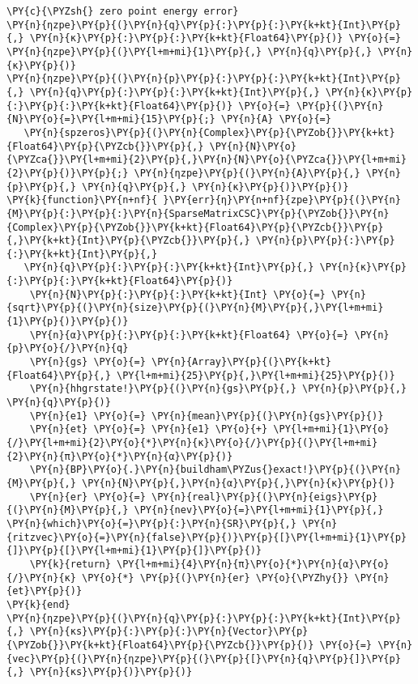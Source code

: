 \begin{Verbatim}[commandchars=\\\{\}]
\PY{c}{\PYZsh{} zero point energy error}
\PY{n}{ηzpe}\PY{p}{(}\PY{n}{q}\PY{p}{:}\PY{p}{:}\PY{k+kt}{Int}\PY{p}{,} \PY{n}{κ}\PY{p}{:}\PY{p}{:}\PY{k+kt}{Float64}\PY{p}{)} \PY{o}{=} \PY{n}{ηzpe}\PY{p}{(}\PY{l+m+mi}{1}\PY{p}{,} \PY{n}{q}\PY{p}{,} \PY{n}{κ}\PY{p}{)}
\PY{n}{ηzpe}\PY{p}{(}\PY{n}{p}\PY{p}{:}\PY{p}{:}\PY{k+kt}{Int}\PY{p}{,} \PY{n}{q}\PY{p}{:}\PY{p}{:}\PY{k+kt}{Int}\PY{p}{,} \PY{n}{κ}\PY{p}{:}\PY{p}{:}\PY{k+kt}{Float64}\PY{p}{)} \PY{o}{=} \PY{p}{(}\PY{n}{N}\PY{o}{=}\PY{l+m+mi}{15}\PY{p}{;} \PY{n}{A} \PY{o}{=}
   \PY{n}{spzeros}\PY{p}{(}\PY{n}{Complex}\PY{p}{\PYZob{}}\PY{k+kt}{Float64}\PY{p}{\PYZcb{}}\PY{p}{,} \PY{n}{N}\PY{o}{\PYZca{}}\PY{l+m+mi}{2}\PY{p}{,}\PY{n}{N}\PY{o}{\PYZca{}}\PY{l+m+mi}{2}\PY{p}{)}\PY{p}{;} \PY{n}{ηzpe}\PY{p}{(}\PY{n}{A}\PY{p}{,} \PY{n}{p}\PY{p}{,} \PY{n}{q}\PY{p}{,} \PY{n}{κ}\PY{p}{)}\PY{p}{)}
\PY{k}{function}\PY{n+nf}{ }\PY{err}{η}\PY{n+nf}{zpe}\PY{p}{(}\PY{n}{M}\PY{p}{:}\PY{p}{:}\PY{n}{SparseMatrixCSC}\PY{p}{\PYZob{}}\PY{n}{Complex}\PY{p}{\PYZob{}}\PY{k+kt}{Float64}\PY{p}{\PYZcb{}}\PY{p}{,}\PY{k+kt}{Int}\PY{p}{\PYZcb{}}\PY{p}{,} \PY{n}{p}\PY{p}{:}\PY{p}{:}\PY{k+kt}{Int}\PY{p}{,}
   \PY{n}{q}\PY{p}{:}\PY{p}{:}\PY{k+kt}{Int}\PY{p}{,} \PY{n}{κ}\PY{p}{:}\PY{p}{:}\PY{k+kt}{Float64}\PY{p}{)}
    \PY{n}{N}\PY{p}{:}\PY{p}{:}\PY{k+kt}{Int} \PY{o}{=} \PY{n}{sqrt}\PY{p}{(}\PY{n}{size}\PY{p}{(}\PY{n}{M}\PY{p}{,}\PY{l+m+mi}{1}\PY{p}{)}\PY{p}{)}
    \PY{n}{α}\PY{p}{:}\PY{p}{:}\PY{k+kt}{Float64} \PY{o}{=} \PY{n}{p}\PY{o}{/}\PY{n}{q}
    \PY{n}{gs} \PY{o}{=} \PY{n}{Array}\PY{p}{(}\PY{k+kt}{Float64}\PY{p}{,} \PY{l+m+mi}{25}\PY{p}{,}\PY{l+m+mi}{25}\PY{p}{)}
    \PY{n}{hhgrstate!}\PY{p}{(}\PY{n}{gs}\PY{p}{,} \PY{n}{p}\PY{p}{,} \PY{n}{q}\PY{p}{)}
    \PY{n}{e1} \PY{o}{=} \PY{n}{mean}\PY{p}{(}\PY{n}{gs}\PY{p}{)}
    \PY{n}{et} \PY{o}{=} \PY{n}{e1} \PY{o}{+} \PY{l+m+mi}{1}\PY{o}{/}\PY{l+m+mi}{2}\PY{o}{*}\PY{n}{κ}\PY{o}{/}\PY{p}{(}\PY{l+m+mi}{2}\PY{n}{π}\PY{o}{*}\PY{n}{α}\PY{p}{)}
    \PY{n}{BP}\PY{o}{.}\PY{n}{buildham\PYZus{}exact!}\PY{p}{(}\PY{n}{M}\PY{p}{,} \PY{n}{N}\PY{p}{,}\PY{n}{α}\PY{p}{,}\PY{n}{κ}\PY{p}{)}
    \PY{n}{er} \PY{o}{=} \PY{n}{real}\PY{p}{(}\PY{n}{eigs}\PY{p}{(}\PY{n}{M}\PY{p}{,} \PY{n}{nev}\PY{o}{=}\PY{l+m+mi}{1}\PY{p}{,} \PY{n}{which}\PY{o}{=}\PY{p}{:}\PY{n}{SR}\PY{p}{,} \PY{n}{ritzvec}\PY{o}{=}\PY{n}{false}\PY{p}{)}\PY{p}{[}\PY{l+m+mi}{1}\PY{p}{]}\PY{p}{[}\PY{l+m+mi}{1}\PY{p}{]}\PY{p}{)}
    \PY{k}{return} \PY{l+m+mi}{4}\PY{n}{π}\PY{o}{*}\PY{n}{α}\PY{o}{/}\PY{n}{κ} \PY{o}{*} \PY{p}{(}\PY{n}{er} \PY{o}{\PYZhy{}} \PY{n}{et}\PY{p}{)}
\PY{k}{end}
\PY{n}{ηzpe}\PY{p}{(}\PY{n}{q}\PY{p}{:}\PY{p}{:}\PY{k+kt}{Int}\PY{p}{,} \PY{n}{κs}\PY{p}{:}\PY{p}{:}\PY{n}{Vector}\PY{p}{\PYZob{}}\PY{k+kt}{Float64}\PY{p}{\PYZcb{}}\PY{p}{)} \PY{o}{=} \PY{n}{vec}\PY{p}{(}\PY{n}{ηzpe}\PY{p}{(}\PY{p}{[}\PY{n}{q}\PY{p}{]}\PY{p}{,} \PY{n}{κs}\PY{p}{)}\PY{p}{)}

\end{Verbatim}
